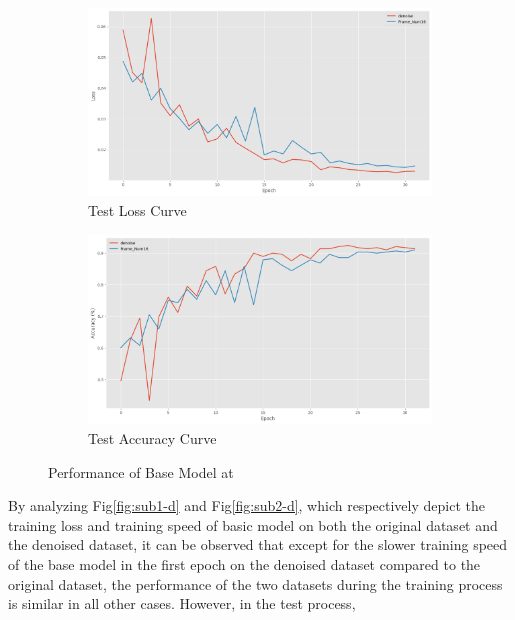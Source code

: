 \documentclass[conference]{IEEEtran}
\begin{document}
\begin{figure}[htbp]
    \begin{subfigure}[b]{0.24\textwidth}
        \centering
        \includegraphics[width=\textwidth]{figure/denoise_test_loss.png}
        \caption{Test Loss Curve}
        \label{fig:sub3-d}
    \end{subfigure}
    \begin{subfigure}[b]{0.24\textwidth}
        \centering
        \includegraphics[width=\textwidth]{figure/denoise_test_acc.png}
        \caption{Test Accuracy Curve}
        \label{fig:sub4-d}
    \end{subfigure}
    \caption{Performance of Base Model at }
    \label{fig:performance-denoise}
\end{figure}
By analyzing Fig\ref{fig:sub1-d} and Fig\ref{fig:sub2-d}, 
which respectively depict the training loss and training speed of basic model on both the original dataset and the denoised dataset, 
it can be observed that except for the slower training speed of the base model in the first epoch on the denoised dataset compared to the original dataset, 
the performance of the two datasets during the training process is similar in all other cases.
However, in the test process,
\end{document}
